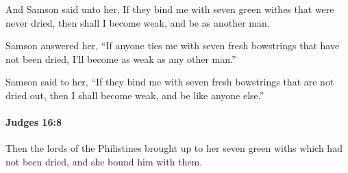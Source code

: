 			\begin{versebox}
					\item[BHS] 
					\item[ASV] And Samson said unto her, If they bind me with seven green withes that were never dried, then shall I become weak, and be as another man.
					\item[NIV] Samson answered her, “If anyone ties me with seven fresh bowstrings that have not been dried, I’ll become as weak as any other man.”
					\item[NRSV] Samson said to her, “If they bind me with seven fresh bowstrings that are not dried out, then I shall become weak, and be like anyone else.”
			\end{versebox}

		\paragraph{Judges 16:8} %
			\label{JUDGES-16-8}

			Then the lords of the Philistines brought up to her seven green withs which had not been dried, and she bound him with them.


